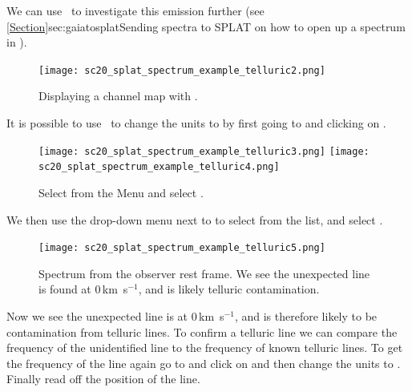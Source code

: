 \documentclass[11pt,oneside,chapters]{starlink}
\newcommand{\kms}{\mbox{$\,$km~s$^{-1}$}}   %
\newcommand{\kms}{\,km~s$^{-1}$}   %
\begin{document}
We can use \splat\ to investigate this emission further (see
\cref{Section}{sec:gaiatosplat}{Sending spectra to SPLAT} on how to
open up a spectrum in \splat).

\begin{figure}[h!]
\begin{center}
\texttt{[image: sc20\_splat\_spectrum\_example\_telluric2.png]}
\caption[blah]{\label{fig:telluric2}
  Displaying a channel map with \splat.}
\end{center}
\end{figure}

It is possible to use \splat\ to change the units to 
by first going to  and clicking on .

\begin{figure}[h!]
\begin{center}
\texttt{[image: sc20\_splat\_spectrum\_example\_telluric3.png]}
\texttt{[image: sc20\_splat\_spectrum\_example\_telluric4.png]}
\caption[blah]{\label{fig:telluric3}
  Select  from the  Menu and select
.}
\end{center}
\end{figure}

We then use the drop-down menu next to  to select
 from the list, and select .


\begin{figure}[h!]
\begin{center}
\texttt{[image: sc20\_splat\_spectrum\_example\_telluric5.png]}
\caption[blah]{\label{fig:telluric4}
  Spectrum from the observer rest frame. We see the unexpected line is
  found at 0\kms, and is likely telluric contamination.}
\end{center}
\end{figure}

Now we see the unexpected line is at 0\kms, and is therefore likely to be
contamination from telluric lines. To confirm a telluric line we can compare the
frequency of the unidentified line to the frequency of known telluric lines.
To get the frequency of the line again go to  and click
on  and then change the units to . Finally read off the position of the line.
\end{document}
